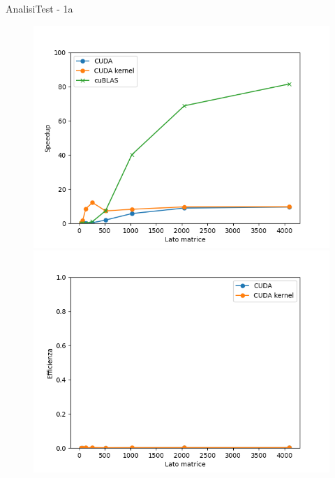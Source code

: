 \begin{frame}{Analisi}{Test - 1a}
    \begin{figure}[H]
        \centering
        \begin{minipage}{0.49\textwidth}
            \includegraphics[width=\textwidth]{./imgs/graphs/caso_0_speedup.png}
        \end{minipage}
        \begin{minipage}{0.49\textwidth}
            \includegraphics[width=\textwidth]{./imgs/graphs/caso_0_efficiency.png}
        \end{minipage}
    \end{figure}
\end{frame}

